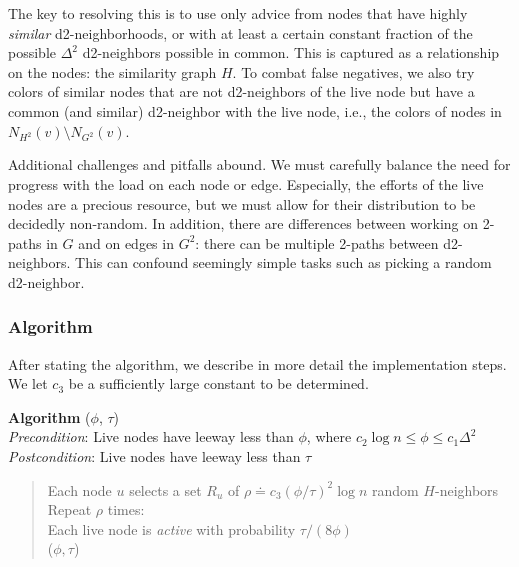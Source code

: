 The key to resolving this is to use only advice from nodes that have highly \emph{similar} d2-neighborhoods, or with at least a certain constant fraction of the possible $\Delta^2$ d2-neighbors possible in common. This is captured as a relationship on the nodes: the similarity graph $H$.
To combat false negatives, we also try colors of similar nodes that are not d2-neighbors of the live node but have a common (and similar) d2-neighbor with the live node, i.e., the colors of nodes in $N_{H^2}(v) \setminus N_{G^2}(v)$.

Additional challenges and pitfalls abound. We must carefully balance the need for progress with the load on each node or edge. Especially, the efforts of the live nodes are a precious resource, %
but we must allow for their distribution to be decidedly non-random.  
In addition, there are differences between working on 2-paths in $G$ and on edges in $G^2$: there can be multiple 2-paths between d2-neighbors. This can confound seemingly simple tasks such as picking a random d2-neighbor.

\subsubsection{Algorithm }
After stating the algorithm, we describe in more detail the implementation steps.
We let $c_3$ be a sufficiently large constant to be determined. 
\medskip

   \textbf{Algorithm} ($\phi$, $\tau$) \\
    \emph{Precondition}: Live nodes have leeway less than $\phi$, where $c_2\log n \le \phi \le c_1\Delta^2$ \\
    \emph{Postcondition}: Live nodes have leeway less than $\tau$


\begin{quote}
   Each node $u$ selects a set $R_u$ of $\rho \doteq c_3 (\phi/\tau)^2 \log n$ random $H$-neighbors \\
    Repeat $\rho$ times: \\
    \hspace*{2em} Each live node is \emph{active} with probability $\tau/(8\phi)$ \\
    \hspace*{2em} ($\phi,\tau$) %
\end{quote}
    
